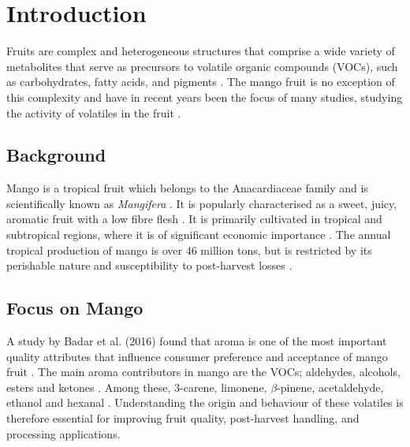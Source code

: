 \setcounter{chapter}{1}
\setcounter{section}{0}
\setlength{\headheight}{12.71342pt}
\addtolength{\topmargin}{-0.71342pt}

\section{Introduction}
Fruits are complex and heterogeneous structures that comprise  a wide variety of metabolites that serve as precursors to volatile organic compounds (VOCs), such as carbohydrates, fatty acids, and pigments \cite*{A03_PanoFarias2017}. The mango fruit is no exception of this complexity and have in recent years been the focus of many studies, studying the activity of volatiles in the fruit \cite*{A04_GUO2023112779}.


\subsection{Background}
Mango is a tropical fruit which belongs to the Anacardiaceae family and is scientifically known as \textit{Mangifera} \cite*{A04_GUO2023112779}. It is popularly characterised as a sweet, juicy, aromatic fruit with a low fibre flesh \cite*{A05_Chin2019}. It is primarily cultivated in tropical and subtropical regions, where it is of significant economic importance \cite*{A05_Chin2019}. 
The annual tropical production of mango is over 46 million tons, but is restricted by its perishable nature and susceptibility to post-harvest losses \cite*{A05_Chin2019}.

\subsection{Focus on Mango}
A study by Badar et al. (2016) found that aroma is one of the most important quality attributes that influence consumer preference and acceptance of mango fruit \cite*{A06_Badar2016}. The main aroma contributors in mango are the VOCs; aldehydes, alcohols, esters and ketones \cite*{A02_Moreno2010}. Among these, 3-carene, limonene, $\beta$-pinene, acetaldehyde, ethanol and hexanal \cite*{A02_Moreno2010}. Understanding the origin and behaviour of these volatiles is therefore essential for improving fruit quality, post-harvest handling, and processing applications.


